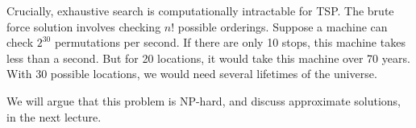 \documentclass[titlepage, 12pt, leqno]{article}
\begin{document}
Crucially, exhaustive search is computationally intractable for TSP. The
brute force solution involves checking $n!$ possible orderings. Suppose a
machine can check $2^{30}$ permutations per second. If there are only 10
stops, this machine takes less than a second. But for 20 locations, it would
take this machine over 70 years. With 30 possible locations, we would need
several lifetimes of the universe.

We will argue that this problem is NP-hard, and discuss approximate solutions,
in the next lecture.
\end{document}
